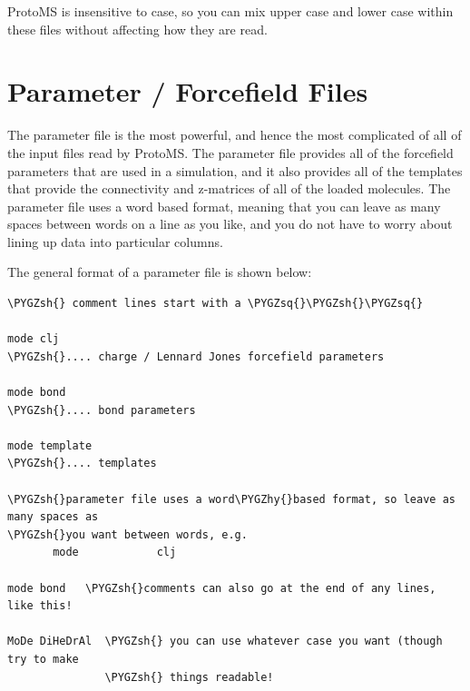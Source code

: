 \documentclass[letterpaper,10pt,english]{sphinxmanual}
\def\PYGZsh{\char`\#}
\def\PYGZhy{\char`\-}
\def\PYGZsq{\char`\'}
\renewcommand\PYGZsq{\textquotesingle}
\begin{document}
ProtoMS is insensitive to case, so you can mix upper case and lower case within these files without affecting how
they are read.


\section{Parameter / Forcefield Files}
\label{protoms:parfil}\label{protoms:parameter-forcefield-files}
The parameter file is the most powerful, and hence the most complicated of all of the input files read by ProtoMS. The parameter file provides all of the forcefield parameters that are used in a simulation, and it also provides all of the templates that provide the connectivity and z-matrices of all of the loaded molecules. The parameter file uses a word based format, meaning that you can leave as many spaces between words on a line as you like, and you do not have to worry about lining up data into particular columns.

The general format of a parameter file is shown below:

\begin{Verbatim}[commandchars=\\\{\}]
\PYGZsh{} comment lines start with a \PYGZsq{}\PYGZsh{}\PYGZsq{}

mode clj
\PYGZsh{}.... charge / Lennard Jones forcefield parameters

mode bond
\PYGZsh{}.... bond parameters

mode template
\PYGZsh{}.... templates

\PYGZsh{}parameter file uses a word\PYGZhy{}based format, so leave as many spaces as
\PYGZsh{}you want between words, e.g.
       mode            clj

mode bond   \PYGZsh{}comments can also go at the end of any lines, like this!

MoDe DiHeDrAl  \PYGZsh{} you can use whatever case you want (though try to make
               \PYGZsh{} things readable!
\end{Verbatim}
\end{document}
